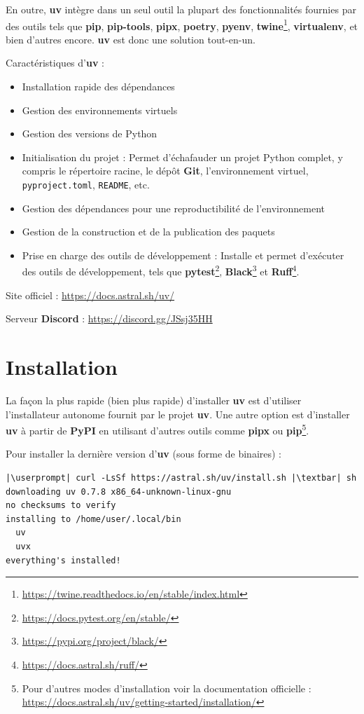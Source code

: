 En outre, \textbf{uv} intègre dans un seul outil la plupart des fonctionnalités fournies par des outils tels que \textbf{pip}, \textbf{pip-tools}, \textbf{pipx}, \textbf{poetry}, \textbf{pyenv}, \textbf{twine}\footnote{\url{https://twine.readthedocs.io/en/stable/index.html}}, \textbf{virtualenv}, et bien d'autres encore. \textbf{uv} est donc une solution tout-en-un.

Caractéristiques d'\textbf{uv} :
\begin{itemize}
    \item Installation rapide des dépendances
    \item Gestion des environnements virtuels
    \item Gestion des versions de Python
    \item Initialisation du projet : Permet d'échafauder un projet Python complet, y compris le répertoire racine, le dépôt \textbf{Git}, l'environnement virtuel, \texttt{pyproject.toml}, \texttt{README}, etc.
    \item Gestion des dépendances pour une reproductibilité de l'environnement
    \item Gestion de la construction et de la publication des paquets
    \item Prise en charge des outils de développement : Installe et permet d'exécuter des outils de développement, tels que \textbf{pytest}\footnote{\url{https://docs.pytest.org/en/stable/}}, \textbf{Black}\footnote{\url{https://pypi.org/project/black/}} et \textbf{Ruff}\footnote{\url{https://docs.astral.sh/ruff/}}.
\end{itemize}
\medskip

Site officiel : \url{https://docs.astral.sh/uv/}

Serveur \textbf{Discord} : \url{https://discord.gg/JSsj35HH}

\section{Installation}
La façon la plus rapide (bien plus rapide) d'installer \textbf{uv} est d'utiliser l'installateur autonome fournit par le projet \textbf{uv}. Une autre option est d'installer \textbf{uv} à partir de \textbf{PyPI} en utilisant d'autres outils comme \textbf{pipx} ou \textbf{pip}\footnote{Pour d'autres modes d'installation voir la documentation officielle : \url{https://docs.astral.sh/uv/getting-started/installation/}}.

Pour installer la dernière version d'\textbf{uv} (sous forme de binaires) :
\begin{lstlisting}[style=bash]
|\userprompt| curl -LsSf https://astral.sh/uv/install.sh |\textbar| sh
downloading uv 0.7.8 x86_64-unknown-linux-gnu
no checksums to verify
installing to /home/user/.local/bin
  uv
  uvx
everything's installed!
\end{lstlisting}

